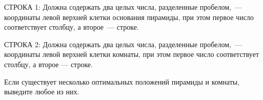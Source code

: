 СТРОКА 1: Должна содержать два целых числа, разделенные
пробелом,~--- координаты левой верхней клетки основания
пирамиды, при этом первое число соответствует столбцу, а
второе~--- строке.

СТРОКА 2: Должна содержать два целых числа, разделенные
пробелом,~--- координаты левой верхней клетки комнаты, при
этом первое число соответствует столбцу, а второе --- строке. 

Если существует несколько оптимальных положений пирамиды и комнаты,
выведите любое из них. 